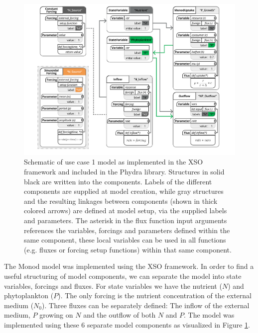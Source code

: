 \documentclass[journal abbreviation, manuscript]{copernicus}
\begin{document}
\begin{figure}[t]
\includegraphics[width=15cm]{Figures/firstdraft_schematics/code_schematics/Chemostat.pdf}
\caption{Schematic of use case 1 model as implemented in the XSO framework and included in the Phydra library. Structures in solid black are written into the components. Labels of the different components are supplied at model creation, while gray structures and the resulting linkages between components (shown in thick colored arrows) are defined at model setup, via the supplied labels and parameters. The asterisk in the flux function input arguments references the variables, forcings and parameters defined within the same component, these local variables can be used in all functions (e.g. fluxes or forcing setup functions) within that same component.}
\label{Figure:CodeSchematics_1}
\end{figure}

The Monod model was implemented using the XSO framework. In order to find a useful structuring of model components, we can separate the model into state variables, forcings and fluxes. For state variables we have the nutrient ($N$) and phytoplankton ($P$). The only forcing is the nutrient concentration of the external medium ($N_0$). Three fluxes can be separately defined: The inflow of the external medium, $P$ growing on $N$ and the outflow of both $N$ and $P$.
The model was implemented using these 6 separate model components as visualized in Figure \ref{Figure:CodeSchematics_1}.
\end{document}
